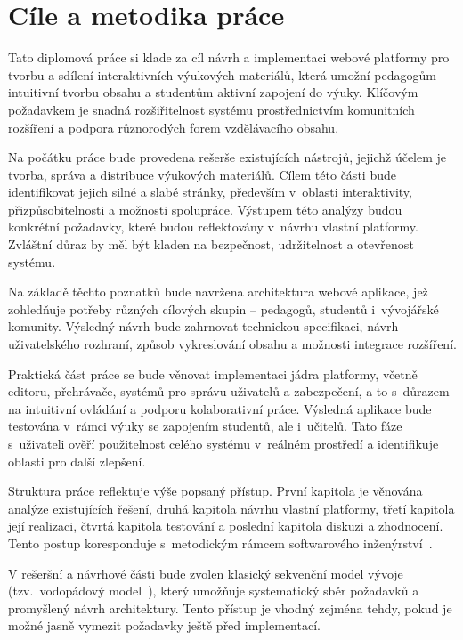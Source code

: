 \chapter*{Cíle a metodika práce}

Tato diplomová práce si klade za cíl návrh a implementaci webové platformy pro tvorbu a sdílení interaktivních výukových materiálů, která umožní pedagogům intuitivní tvorbu obsahu a studentům aktivní zapojení do výuky. 
Klíčovým požadavkem je snadná rozšiřitelnost systému prostřednictvím komunitních rozšíření a podpora různorodých forem vzdělávacího obsahu.

Na počátku práce bude provedena rešerše existujících nástrojů, jejichž účelem je tvorba, správa a distribuce výukových materiálů. 
Cílem této části bude identifikovat jejich silné a slabé stránky, především v~oblasti interaktivity, přizpůsobitelnosti a možnosti spolupráce. 
Výstupem této analýzy budou konkrétní požadavky, které budou reflektovány v~návrhu vlastní platformy. 
Zvláštní důraz by měl být kladen na bezpečnost, udržitelnost a otevřenost systému.

Na základě těchto poznatků bude navržena architektura webové aplikace, jež zohledňuje potřeby různých cílových skupin -- pedagogů, studentů i~vývojářské komunity.
Výsledný návrh bude zahrnovat technickou specifikaci, návrh uživatelského rozhraní, způsob vykreslování obsahu a možnosti integrace rozšíření.

Praktická část práce se bude věnovat implementaci jádra platformy, včetně editoru, přehrávače, systémů pro správu uživatelů a zabezpečení, a to s~důrazem na intuitivní ovládání a podporu kolaborativní práce.
Výsledná aplikace bude testována v~rámci výuky se zapojením studentů, ale i~učitelů.
Tato fáze s~uživateli ověří použitelnost celého systému v~reálném prostředí a identifikuje oblasti pro další zlepšení.

Struktura práce reflektuje výše popsaný přístup. 
První kapitola je věnována analýze existujících řešení, druhá kapitola návrhu vlastní platformy, třetí kapitola její realizaci, čtvrtá kapitola testování a poslední kapitola diskuzi a zhodnocení. 
Tento postup koresponduje s~metodickým rámcem softwarového inženýrství~\cite{laplante2007software}.

V rešeršní a návrhové části bude zvolen klasický sekvenční model vývoje (tzv.~vodopádový model~\cite{laplante2007software}), který umožňuje systematický sběr požadavků a promyšlený návrh architektury.
Tento přístup je vhodný zejména tehdy, pokud je možné jasně vymezit požadavky ještě před implementací.

